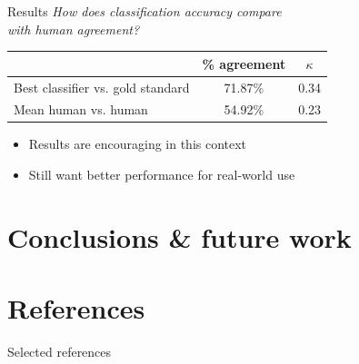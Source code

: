 \documentclass[xcolor={dvipsnames}]{beamer}
\renewcommand{\footnotesize}{\scriptsize}
\begin{document}
	\begin{frame}{Results}
		\textit{How does classification accuracy compare \\with human agreement?}
		\vfill
		\begin{tabularx}{\textwidth}{Xcc}
		\toprule
		& \% agreement & $\kappa$ \\
		\midrule
		Best classifier vs. gold standard & 71.87\% & 0.34\\
		Mean human vs. human & 54.92\%	&	0.23\\
		\bottomrule
		\end{tabularx}
		\vfill
		\begin{itemize}
		\item Results are encouraging in this context
		\item Still want better performance for real-world use
		\end{itemize}
	\end{frame}

\section{Conclusions \& future work}
\begin{frame}
\end{frame}

\section{References}
\begin{frame}[noframenumbering]{Selected references}
\renewcommand*{\bibfont}{\footnotesize}
    \printbibliography

\end{frame}
\end{document}
